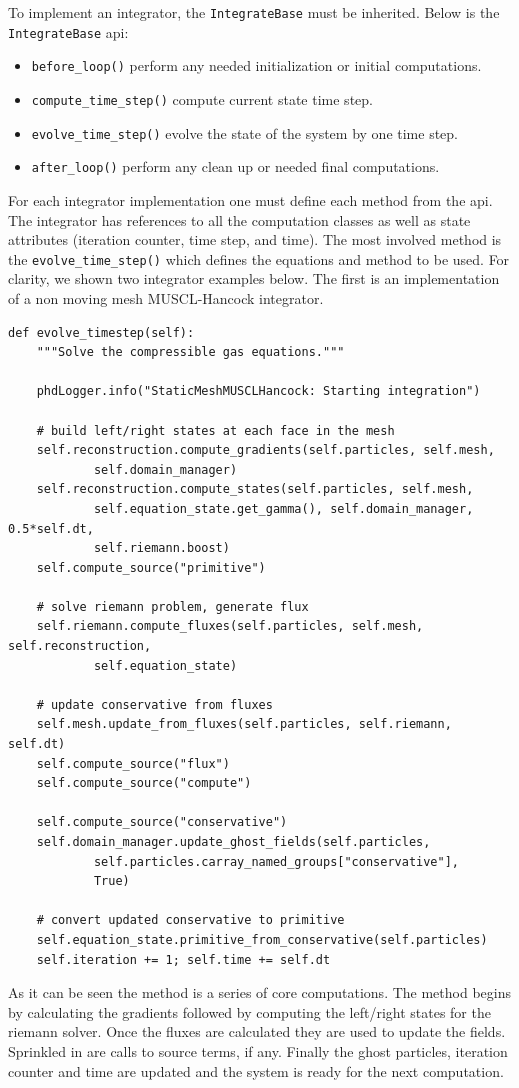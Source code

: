 To implement an integrator, the \lstinline{IntegrateBase} must be inherited. Below
is the \lstinline{IntegrateBase} api:
\begin{itemize}
    \item \lstinline{before_loop()} perform any needed initialization or initial computations. 
    \item \lstinline{compute_time_step()} compute current state time step.
    \item \lstinline{evolve_time_step()} evolve the state of the system by one time step.
    \item \lstinline{after_loop()} perform any clean up or needed final computations.
\end{itemize}
For each integrator implementation one must define each method from the api. The integrator
has references to all the computation classes as well as state attributes (iteration
counter, time step, and time). The most
involved method is the \lstinline{evolve_time_step()} which defines the equations
and method to be used. For clarity, we shown two integrator examples below. The first
is an implementation of a non moving mesh MUSCL-Hancock integrator.
\begin{lstlisting}
def evolve_timestep(self):
    """Solve the compressible gas equations."""

    phdLogger.info("StaticMeshMUSCLHancock: Starting integration")

    # build left/right states at each face in the mesh
    self.reconstruction.compute_gradients(self.particles, self.mesh,
            self.domain_manager)
    self.reconstruction.compute_states(self.particles, self.mesh,
            self.equation_state.get_gamma(), self.domain_manager, 0.5*self.dt,
            self.riemann.boost)
    self.compute_source("primitive")

    # solve riemann problem, generate flux
    self.riemann.compute_fluxes(self.particles, self.mesh, self.reconstruction,
            self.equation_state)

    # update conservative from fluxes
    self.mesh.update_from_fluxes(self.particles, self.riemann, self.dt)
    self.compute_source("flux")
    self.compute_source("compute")

    self.compute_source("conservative")
    self.domain_manager.update_ghost_fields(self.particles,
            self.particles.carray_named_groups["conservative"],
            True)

    # convert updated conservative to primitive
    self.equation_state.primitive_from_conservative(self.particles)
    self.iteration += 1; self.time += self.dt
\end{lstlisting}
As it can be seen the method is a series of core computations. The method
begins by calculating the gradients followed by computing the left/right
states for the riemann solver. Once the fluxes are calculated they are used
to update the fields. Sprinkled in are calls to source terms, if any.
Finally the ghost particles, iteration counter and
time are updated and the system is ready for the next computation.


